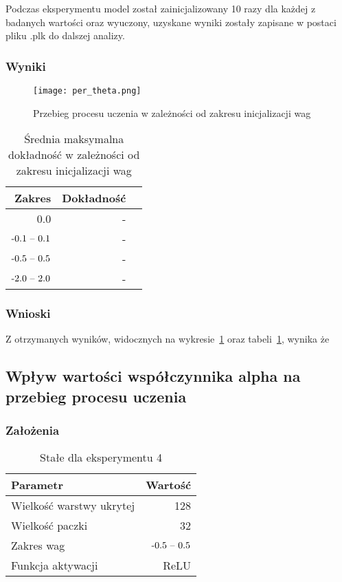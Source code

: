 \documentclass{article}
\begin{document}
Podczas eksperymentu model został zainicjalizowany 10 razy dla każdej z badanych wartości oraz wyuczony, uzyskane wyniki zostały zapisane w postaci pliku .plk do dalszej analizy.

\subsubsection*{Wyniki}
\begin{figure}[!h]
	\centering
	\caption{Przebieg procesu uczenia w zależności od zakresu inicjalizacji wag}
	\texttt{[image: per\_theta.png]}
	\label{fig:res31}
\end{figure}

\begin{table}[!h]
	\caption{Średnia maksymalna dokładność w zależności od zakresu inicjalizacji wag}
	\label{tabela-res-31}
	\centering
	\begin{tabular}{rrr}
		\toprule
		Zakres            & Dokładność \\
		\midrule
		0.0               & -             \\
		\($-0.1 -- 0.1$\) & -             \\
		\($-0.5 -- 0.5$\) & -             \\
		\($-2.0 -- 2.0$\) & -             \\
		\bottomrule
	\end{tabular}
\end{table}

\subsubsection*{Wnioski}

Z otrzymanych wyników, widocznych na wykresie~\ref{fig:res31} oraz tabeli~\ref{tabela-res-31}, wynika że

\newpage
\subsection{Wpływ wartości współczynnika alpha na przebieg procesu uczenia}
\subsubsection*{Założenia}
\begin{table}[!h]
	\caption{Stałe dla eksperymentu 4}
	\label{tabela-const-4}
	\centering
	\begin{tabular}{lr}
		\toprule
		Parametr                   & Wartość         \\
		\midrule
		Wielkość warstwy ukrytej & 128               \\
		Wielkość paczki          & 32                \\
		Zakres wag                 & \($-0.5 -- 0.5$\) \\
		Funkcja aktywacji          & ReLU              \\
		\bottomrule
	\end{tabular}
\end{table}
\end{document}
